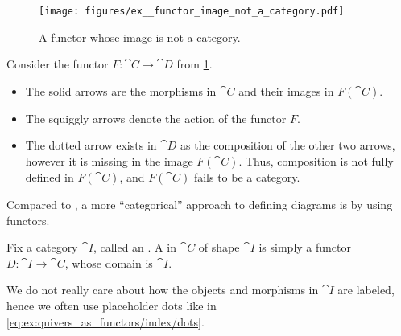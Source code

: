 \begin{example}\label{ex:functor_image_not_a_category}
  \begin{figure}
    \hfill
    \texttt{[image: figures/ex\_\_functor\_image\_not\_a\_category.pdf]}
    \hfill
    \hfill
    \caption{A functor whose image is not a category.}\label{fig:ex:functor_image_not_a_category}
  \end{figure}

  Consider the functor \( F: \cat{C} \to \cat{D} \) from \cref{fig:ex:functor_image_not_a_category}.

  \begin{itemize}
    \item The solid arrows are the morphisms in \( \cat{C} \) and their images in \( F(\cat{C}) \).
    \item The squiggly arrows denote the action of the functor \( F \).
    \item The dotted arrow exists in \( \cat{D} \) as the composition of the other two arrows, however it is missing in the image \( F(\cat{C}) \). Thus, composition is not fully defined in \( F(\cat{C}) \), and \( F(\cat{C}) \) fails to be a category.
  \end{itemize}
\end{example}

\begin{remark}\label{rem:categorical_diagram_as_functor}
  Compared to , a more \enquote{categorical} approach to defining diagrams is by using functors.

  Fix a category \( \cat{I} \), called an . A  in \( \cat{C} \) of shape \( \cat{I} \) is simply a functor \( D: \cat{I} \to \cat{C} \), whose domain is \( \cat{I} \).

  We do not really care about how the objects and morphisms in \( \cat{I} \) are labeled, hence we often use placeholder dots like in \eqref{eq:ex:quivers_as_functors/index/dots}.
\end{remark}


